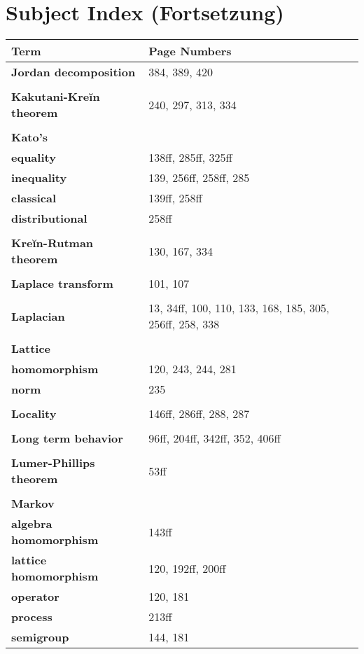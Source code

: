 \documentclass[10pt]{scrartcl}
\begin{document}
\section*{Subject Index (Fortsetzung)}

\begin{longtable}{>{\bfseries}p{6cm}p{8cm}}
\textbf{Term} & \textbf{Page Numbers} \\
\hline
\endhead

\textbf{Jordan decomposition} & 384, 389, 420 \\
\\
\textbf{Kakutani-Kreĭn theorem} & 240, 297, 313, 334 \\
\\
\textbf{Kato's} & \\
\quad equality & 138ff, 285ff, 325ff \\
\quad inequality & 139, 256ff, 258ff, 285 \\
\quad classical & 139ff, 258ff \\
\quad distributional & 258ff \\
\\
\textbf{Kreĭn-Rutman theorem} & 130, 167, 334 \\
\\
\textbf{Laplace transform} & 101, 107 \\
\\
\textbf{Laplacian} & 13, 34ff, 100, 110, 133, 168, 185, 305, 256ff, 258, 338 \\
\\
\textbf{Lattice} & \\
\quad homomorphism & 120, 243, 244, 281 \\
\quad norm & 235 \\
\\
\textbf{Locality} & 146ff, 286ff, 288, 287 \\
\\
\textbf{Long term behavior} & 96ff, 204ff, 342ff, 352, 406ff \\
\\
\textbf{Lumer-Phillips theorem} & 53ff \\
\\
\textbf{Markov} & \\
\quad algebra homomorphism & 143ff \\
\quad lattice homomorphism & 120, 192ff, 200ff \\
\quad operator & 120, 181 \\
\quad process & 213ff \\
\quad semigroup & 144, 181 \\

\end{longtable}
\end{document}
